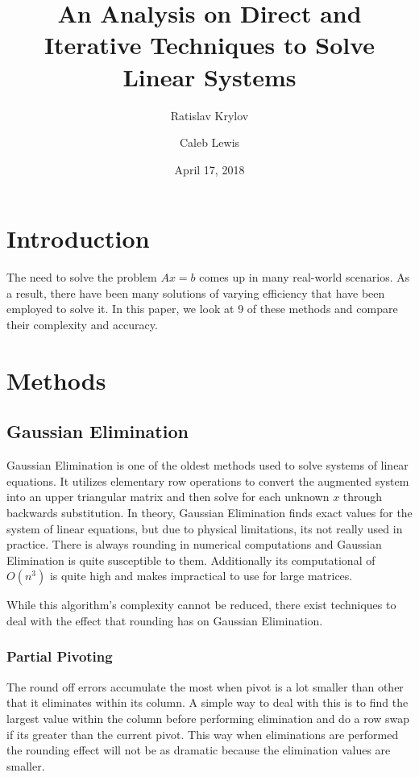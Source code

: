 \documentclass[11pt]{article}	%
\title{An Analysis on Direct and Iterative Techniques to Solve Linear Systems}
\author{Ratislav Krylov \and Caleb Lewis}
\date{April 17, 2018} %
\begin{document}
\maketitle

\section{Introduction}
The need to solve the problem $Ax = b$ comes up in many real-world scenarios.
As a result, there have been many solutions of varying efficiency that
have been employed to solve it. In this paper, we look at 9 of these methods and
compare their complexity and accuracy.

\section{Methods}

\subsection{Gaussian Elimination}
Gaussian Elimination is one of the oldest methods used to solve systems of linear equations. It utilizes elementary row operations to convert the augmented system into an upper triangular matrix and then solve for each unknown $x$ through backwards substitution. In theory, Gaussian Elimination finds exact values for the system of linear equations, but due to physical limitations, its not really used in practice. There is always rounding in numerical computations and Gaussian Elimination is quite susceptible to them. Additionally its computational of $O(n^3)$ is quite high and makes impractical to use for large matrices.

While this algorithm's complexity cannot be reduced, there exist techniques to deal with the effect that rounding has on Gaussian Elimination.

    \subsubsection{Partial Pivoting}
    The round off errors accumulate the most when pivot is a lot smaller than other that it eliminates within its column. A simple way to deal with this is to find the largest value within the column before performing elimination and do a row swap if its greater than the current pivot. This way when eliminations are performed the rounding effect will not be as dramatic because the elimination values are smaller.
\end{document}
